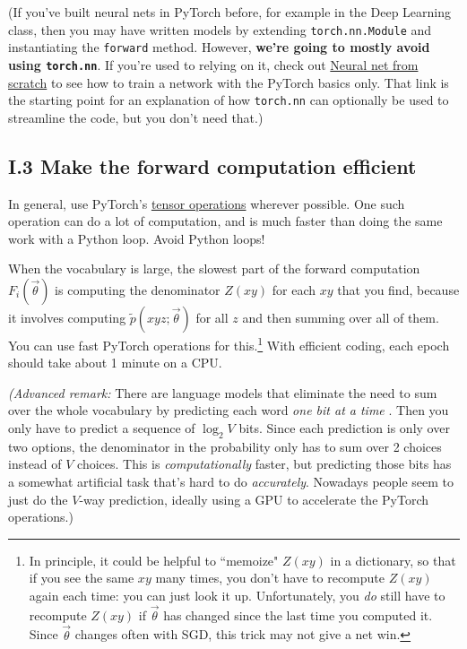 (If you’ve built neural nets in PyTorch before, for example in the Deep Learning class, then you may have written models by extending \texttt{torch.nn.Module} and instantiating the \texttt{forward} method. However, \textbf{we’re going to mostly avoid using \texttt{torch.nn}}. If you’re used to relying on it, check out \href{https://pytorch.org/tutorials/beginner/nn_tutorial.html}{Neural net from scratch} to see how to train a network with the PyTorch basics only. That link is the starting point for an explanation of how \texttt{torch.nn} can optionally be used to streamline the code, but you don’t need that.)

\subsection*{I.3 Make the forward computation efficient}

In general, use PyTorch’s \href{https://pytorch.org/docs/stable/tensors.html\#torch.Tensor}{tensor operations} wherever possible. One such operation can do a lot of computation, and is much faster than doing the same work with a Python loop. Avoid Python loops!

When the vocabulary is large, the slowest part of the forward computation $F_i(\vec{\theta})$ is computing the denominator $Z(xy)$ for each $xy$ that you find, because it involves computing $\tilde{p}(xyz;\vec{\theta})$ for all $z$ and then summing over all of them. You can use fast PyTorch operations for this.\footnote{In principle, it could be helpful to ``memoize" $Z(xy)$ in a dictionary, so that if you see the same $xy$ many times, you don’t have to recompute $Z(xy)$ again each time: you can just look it up. Unfortunately, you \emph{do} still have to recompute $Z(xy)$ if $\vec{\theta}$ has changed since the last time you computed it. Since $\vec{\theta}$ changes often with SGD, this trick may not give a net win.} With efficient coding, each epoch should take about 1 minute on a CPU.

\textit{(Advanced remark:} There are language models that eliminate the need to sum over the whole vocabulary by predicting each word \textit{one bit at a time} \citep{MnihHinton2009}. Then you only have to predict a sequence of $\log_2 V$ bits. Since each prediction is only over two options, the denominator in the probability only has to sum over 2 choices instead of $V$ choices. This is \textit{computationally} faster, but predicting those bits has a somewhat artificial task that’s hard to do \textit{accurately}. Nowadays people seem to just do the $V$-way prediction, ideally using a GPU to accelerate the PyTorch operations.) 

